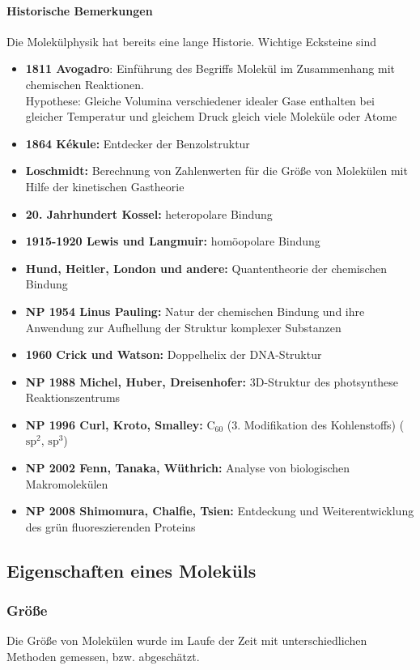     \paragraph{Historische Bemerkungen} Die Molekülphysik hat bereits eine lange Historie. Wichtige Ecksteine sind
    \begin{itemize}
    	\item \textbf{1811 Avogadro}: Einführung des Begriffs Molekül im Zusammenhang mit chemischen Reaktionen.\\
    		Hypothese: Gleiche Volumina verschiedener idealer Gase enthalten bei gleicher Temperatur und gleichem Druck gleich viele Moleküle oder Atome
    	\item \textbf{1864 Kékule:} Entdecker der Benzolstruktur
    	\item \textbf{Loschmidt:} Berechnung von Zahlenwerten für die Größe von Molekülen mit Hilfe der kinetischen Gastheorie
    	\item \textbf{20. Jahrhundert Kossel:} heteropolare Bindung
    	\item \textbf{1915-1920 Lewis und Langmuir:} homöopolare Bindung
    	\item \textbf{Hund, Heitler, London und andere:} Quantentheorie der chemischen Bindung
    	\item \textbf{NP 1954 Linus Pauling:} Natur der chemischen Bindung und ihre Anwendung zur Aufhellung der Struktur komplexer Substanzen 
    	\item \textbf{1960 Crick und Watson:} Doppelhelix der DNA-Struktur
    	\item \textbf{NP 1988 Michel, Huber, Dreisenhofer:} 3D-Struktur des photsynthese Reaktionszentrums
    	\item \textbf{NP 1996 Curl, Kroto, Smalley:} $\text{C}_{60}$ (3. Modifikation des Kohlenstoffs) ($\text{sp}^{2}$, $\text{sp}^{3}$)
    	\item \textbf{NP 2002 Fenn, Tanaka, Wüthrich:} Analyse von biologischen Makromolekülen
    	\item \textbf{NP 2008 Shimomura, Chalfie, Tsien:} Entdeckung und Weiterentwicklung des grün fluoreszierenden Proteins
    \end{itemize}

\subsection{Eigenschaften eines Moleküls}
    \subsubsection{Größe}
    Die Größe von Molekülen wurde im Laufe der Zeit mit unterschiedlichen Methoden gemessen, bzw. abgeschätzt.
